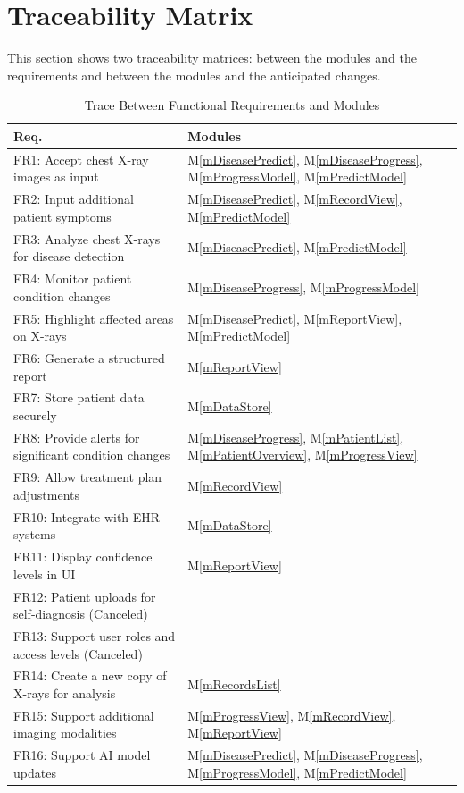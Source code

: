 \documentclass[12pt, titlepage]{article}
\newcommand{\mref}[1]{M\ref{#1}}
\begin{document}
\section{Traceability Matrix} \label{SecTM}

This section shows two traceability matrices: between the modules and the
requirements and between the modules and the anticipated changes.

\begin{table}[H]
\centering
\begin{tabular}{p{} p{}}
\toprule
\textbf{Req.} & \textbf{Modules}\\
\midrule
FR1: Accept chest X-ray images as input & \mref{mDiseasePredict}, \mref{mDiseaseProgress}, \mref{mProgressModel}, \mref{mPredictModel}\\
FR2: Input additional patient symptoms & \mref{mDiseasePredict}, \mref{mRecordView}, \mref{mPredictModel}\\
FR3: Analyze chest X-rays for disease detection & \mref{mDiseasePredict}, \mref{mPredictModel}\\
FR4: Monitor patient condition changes & \mref{mDiseaseProgress}, \mref{mProgressModel}\\
FR5: Highlight affected areas on X-rays & \mref{mDiseasePredict}, \mref{mReportView}, \mref{mPredictModel}\\
FR6: Generate a structured report & \mref{mReportView}\\
FR7: Store patient data securely & \mref{mDataStore}\\
FR8: Provide alerts for significant condition changes & \mref{mDiseaseProgress}, \mref{mPatientList}, \mref{mPatientOverview}, \mref{mProgressView}\\
FR9: Allow treatment plan adjustments & \mref{mRecordView}\\
FR10: Integrate with EHR systems & \mref{mDataStore}\\
FR11: Display confidence levels in UI & \mref{mReportView}\\
FR12: Patient uploads for self-diagnosis (Canceled) & \\
FR13: Support user roles and access levels (Canceled) & \\
FR14: Create a new copy of X-rays for analysis & \mref{mRecordsList}\\
FR15: Support additional imaging modalities & \mref{mProgressView}, \mref{mRecordView}, \mref{mReportView}\\
FR16: Support AI model updates & \mref{mDiseasePredict}, \mref{mDiseaseProgress}, \mref{mProgressModel}, \mref{mPredictModel}\\
\bottomrule
\end{tabular}
\caption{Trace Between Functional Requirements and Modules}
\label{TblRT}
\end{table}
\end{document}
